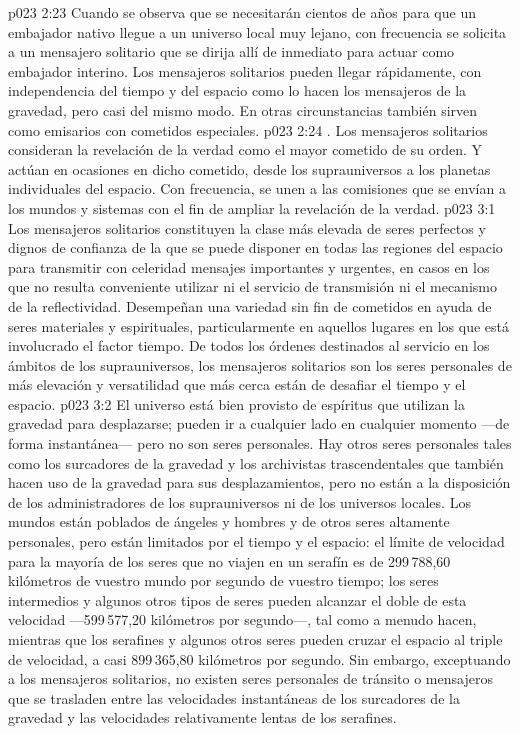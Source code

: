 \vs p023 2:23 Cuando se observa que se necesitarán cientos de años para que un embajador nativo llegue a un universo local muy lejano, con frecuencia se solicita a un mensajero solitario que se dirija allí de inmediato para actuar como embajador interino. Los mensajeros solitarios pueden llegar rápidamente, con independencia del tiempo y del espacio como lo hacen los mensajeros de la gravedad, pero casi del mismo modo. En otras circunstancias también sirven como emisarios con cometidos especiales.
\vs p023 2:24 . Los mensajeros solitarios consideran la revelación de la verdad como el mayor cometido de su orden. Y actúan en ocasiones en dicho cometido, desde los suprauniversos a los planetas individuales del espacio. Con frecuencia, se unen a las comisiones que se envían a los mundos y sistemas con el fin de ampliar la revelación de la verdad.
\vs p023 3:1 Los mensajeros solitarios constituyen la clase más elevada de seres perfectos y dignos de confianza de la que se puede disponer en todas las regiones del espacio para transmitir con celeridad mensajes importantes y urgentes, en casos en los que no resulta conveniente utilizar ni el servicio de transmisión ni el mecanismo de la reflectividad. Desempeñan una variedad sin fin de cometidos en ayuda de seres materiales y espirituales, particularmente en aquellos lugares en los que está involucrado el factor tiempo. De todos los órdenes destinados al servicio en los ámbitos de los suprauniversos, los mensajeros solitarios son los seres personales de más elevación y versatilidad que más cerca están de desafiar el tiempo y el espacio.
\vs p023 3:2 \pc El universo está bien provisto de espíritus que utilizan la gravedad para desplazarse; pueden ir a cualquier lado en cualquier momento ---de forma instantánea--- pero no son seres personales. Hay otros seres personales tales como los surcadores de la gravedad y los archivistas trascendentales que también hacen uso de la gravedad para sus desplazamientos, pero no están a la disposición de los administradores de los suprauniversos ni de los universos locales. Los mundos están poblados de ángeles y hombres y de otros seres altamente personales, pero están limitados por el tiempo y el espacio: el límite de velocidad para la mayoría de los seres que no viajen en un serafín es de 299\,788,60 kilómetros de vuestro mundo por segundo de vuestro tiempo; los seres intermedios y algunos otros tipos de seres pueden alcanzar el doble de esta velocidad ---599\,577,20 kilómetros por segundo---, tal como a menudo hacen, mientras que los serafines y algunos otros seres pueden cruzar el espacio al triple de velocidad, a casi 899\,365,80 kilómetros por segundo. Sin embargo, exceptuando a los mensajeros solitarios, no existen seres personales de tránsito o mensajeros que se trasladen entre las velocidades instantáneas de los surcadores de la gravedad y las velocidades relativamente lentas de los serafines.
